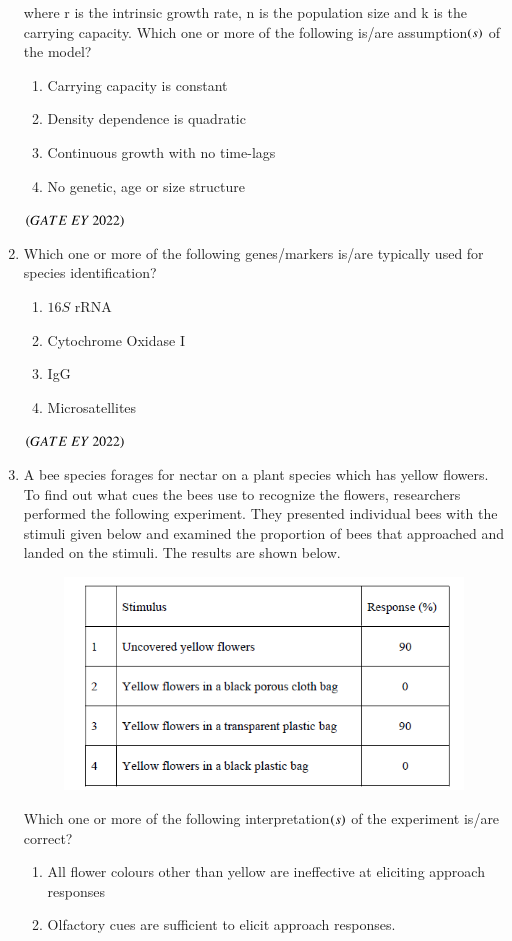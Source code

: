 \documentclass[journal]{IEEEtran}
\numberwithin{equation}{enumi}
\numberwithin{figure}{enumi}
\begin{document}
\begin{enumerate}
 where r is the intrinsic growth rate, n is the population size and k is the carrying
capacity. Which one or more of the following is/are assumption$\left(s\right)$ of the model?
    \begin{enumerate}
        \item  Carrying capacity is constant
        \item  Density dependence is quadratic
        \item  Continuous growth with no time-lags
        \item  No genetic, age or size structure
    \end{enumerate}
    \hfill{$\brak{ GATE\ EY\ 2022}$}
    \bigskip
 \item Which one or more of the following genes/markers is/are typically used for species
identification?
    \begin{enumerate}
        \item  $16S$ rRNA
        \item  Cytochrome Oxidase I
        \item  IgG
        \item  Microsatellites
    \end{enumerate}
    \hfill{$\brak{ GATE\ EY\ 2022}$}
    \bigskip
 \item A bee species forages for nectar on a plant species which has yellow flowers. To find
out what cues the bees use to recognize the flowers, researchers performed the
following experiment. They presented individual bees with the stimuli given below
and examined the proportion of bees that approached and landed on the stimuli.
The results are shown below.
\begin{figure}[H]
    \centering
\includegraphics[width=0.5\columnwidth]{figs/15.png}
    \caption{}
    \label{fig:15}
   \end{figure}
Which one or more of the following interpretation$\left(s\right)$ of the experiment is/are correct?
    \begin{enumerate}
        \item  All flower colours other than yellow are ineffective at eliciting approach responses
        \item  Olfactory cues are sufficient to elicit approach responses.

\end{enumerate}
\end{enumerate}
\end{document}
